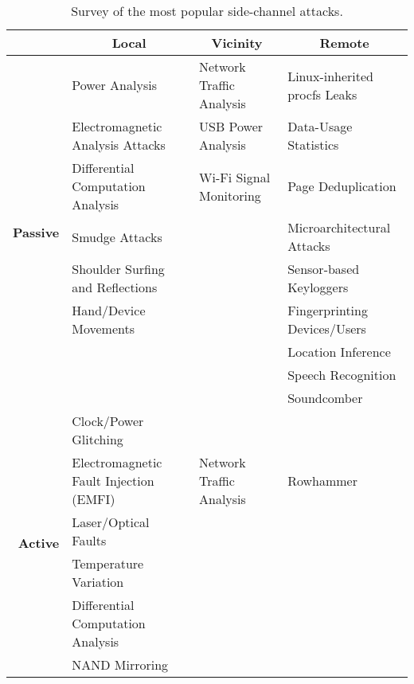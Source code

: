 \begin{table}[h]
\centering \footnotesize
\renewcommand*\arraystretch{1.3}
\begin{tabular}{rlll}
\toprule
{} & \multicolumn{1}{c}{\textbf{Local}} & \multicolumn{1}{c}{\textbf{Vicinity}} & \multicolumn{1}{c}{\textbf{Remote}}\\
\midrule
\multirow{9}{*}{\textbf{Passive}} & {Power Analysis} & {Network Traffic Analysis} & {Linux-inherited procfs Leaks}\\
& {Electromagnetic Analysis Attacks} &  {USB Power Analysis} & {Data-Usage Statistics}\\
& {Differential Computation Analysis} & {Wi-Fi Signal Monitoring} & {Page Deduplication}\\
& {Smudge Attacks} &  & {Microarchitectural Attacks}\\
& {Shoulder Surfing and Reflections} &  & {Sensor-based Keyloggers}\\
& {Hand/Device Movements} &  & {Fingerprinting Devices/Users}\\
&  &  & {Location Inference}\\
&  &  & {Speech Recognition}\\
&  &  & {Soundcomber}\\
\midrule
\multirow{6}{*}{\textbf{Active}} & {Clock/Power Glitching} &\\
& {Electromagnetic Fault Injection (EMFI)} & {Network Traffic Analysis} & {Rowhammer}\\
& {Laser/Optical Faults} &  & \\
& {Temperature Variation} &  & \\
& {Differential Computation Analysis} &  & \\
& {NAND Mirroring} &  & \\
\bottomrule
\end{tabular}
\caption{\footnotesize{Survey of the most popular side-channel attacks\cite{side_classification}.}}
\label{sc:review}
\end{table}


